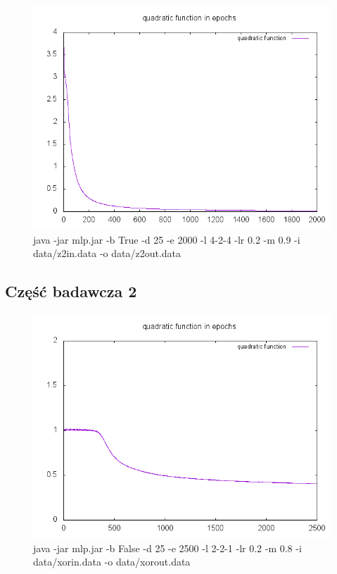 \documentclass{classrep}
\begin{document}
{\newpage
\begin{figure}[h!]
 \centering
 \includegraphics[width=12cm]{img/424lr02m09.png}
 \vspace{-0.3cm}
 \caption{java -jar mlp.jar -b True -d 25 -e 2000 -l 4-2-4 -lr 0.2 -m 0.9 -i data/z2in.data -o data/z2out.data}
\end{figure}

\subsection{Część badawcza 2}
\begin{figure}[h!]
 \centering
 \includegraphics[width=12cm]{img/xor221biasfalse.png}
 \vspace{-0.3cm}
 \caption{java -jar mlp.jar -b False -d 25 -e 2500 -l 2-2-1 -lr 0.2 -m 0.8 -i data/xorin.data -o data/xorout.data}
\end{figure}

}
\end{document}
